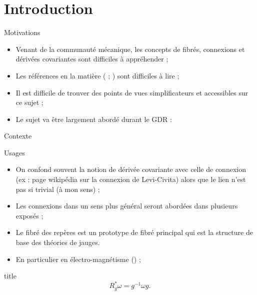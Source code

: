 \section{Introduction}

\begin{frame}{Motivations}
    \begin{itemize}
        \item Venant de la communauté mécanique, les concepts de fibrés, connexions et dérivées covariantes sont difficiles à appréhender ;
        \item Les références en la matière (\alert{\cite{bleecker_gauge_1981}} ; \cite{kobayashi_foundations_1996}) sont difficiles à lire ;
        \item Il est difficile de trouver des points de vues simplificateurs et accessibles sur ce sujet ;
        \item Le sujet va être largement abordé durant le GDR :
    \end{itemize}
\end{frame}

\begin{RecapFrame}{Contexte}
    \begin{block}{Usages}
        \begin{itemize}
            \item On confond souvent la notion de dérivée covariante avec celle de connexion (ex : page wikipédia sur la connexion de Levi-Civita) alors que le lien n'est pas si trivial (à mon sens) ;
            \item \alert{Les connexions dans un sens plus général} seront abordées dans plusieurs exposés ;
            \item Le fibré des repères est un prototype de fibré principal qui est la structure de base des théories de jauges.
            \item En particulier en électro-magnétisme (\cite{weyl_gravitation_1918}) ;
        \end{itemize}
    \end{block}
    \begin{alertblock}{title}
        \begin{equation*}
            R_g^*\omega = g^{-1}\omega g.
        \end{equation*}
    \end{alertblock}
\end{RecapFrame}


